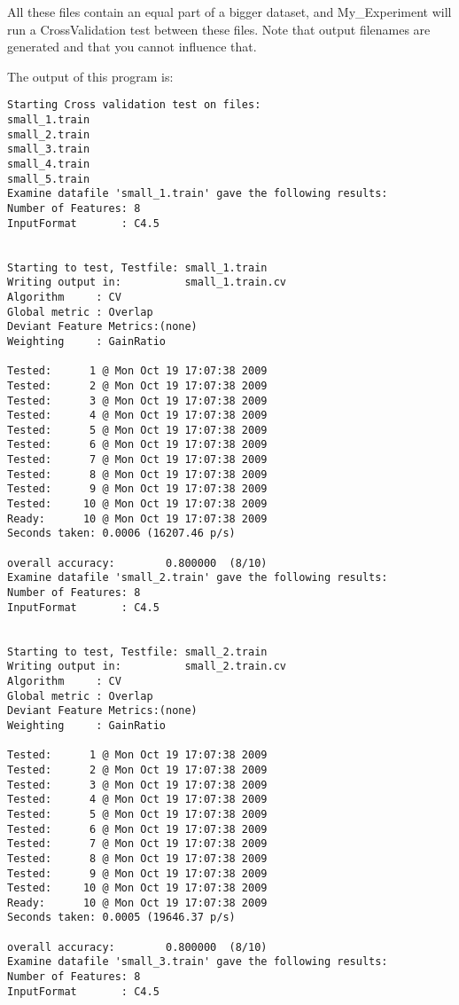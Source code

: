 \documentclass{report}
\begin{document}
All these files contain an equal part of a bigger dataset, and
My\_Experiment will run a CrossValidation test between these files.
Note that output filenames are generated and that you cannot influence
that.

The output of this program is:

\begin{footnotesize}
\begin{verbatim}
Starting Cross validation test on files:
small_1.train
small_2.train
small_3.train
small_4.train
small_5.train
Examine datafile 'small_1.train' gave the following results:
Number of Features: 8
InputFormat       : C4.5


Starting to test, Testfile: small_1.train
Writing output in:          small_1.train.cv
Algorithm     : CV
Global metric : Overlap
Deviant Feature Metrics:(none)
Weighting     : GainRatio

Tested:      1 @ Mon Oct 19 17:07:38 2009
Tested:      2 @ Mon Oct 19 17:07:38 2009
Tested:      3 @ Mon Oct 19 17:07:38 2009
Tested:      4 @ Mon Oct 19 17:07:38 2009
Tested:      5 @ Mon Oct 19 17:07:38 2009
Tested:      6 @ Mon Oct 19 17:07:38 2009
Tested:      7 @ Mon Oct 19 17:07:38 2009
Tested:      8 @ Mon Oct 19 17:07:38 2009
Tested:      9 @ Mon Oct 19 17:07:38 2009
Tested:     10 @ Mon Oct 19 17:07:38 2009
Ready:      10 @ Mon Oct 19 17:07:38 2009
Seconds taken: 0.0006 (16207.46 p/s)

overall accuracy:        0.800000  (8/10)
Examine datafile 'small_2.train' gave the following results:
Number of Features: 8
InputFormat       : C4.5


Starting to test, Testfile: small_2.train
Writing output in:          small_2.train.cv
Algorithm     : CV
Global metric : Overlap
Deviant Feature Metrics:(none)
Weighting     : GainRatio

Tested:      1 @ Mon Oct 19 17:07:38 2009
Tested:      2 @ Mon Oct 19 17:07:38 2009
Tested:      3 @ Mon Oct 19 17:07:38 2009
Tested:      4 @ Mon Oct 19 17:07:38 2009
Tested:      5 @ Mon Oct 19 17:07:38 2009
Tested:      6 @ Mon Oct 19 17:07:38 2009
Tested:      7 @ Mon Oct 19 17:07:38 2009
Tested:      8 @ Mon Oct 19 17:07:38 2009
Tested:      9 @ Mon Oct 19 17:07:38 2009
Tested:     10 @ Mon Oct 19 17:07:38 2009
Ready:      10 @ Mon Oct 19 17:07:38 2009
Seconds taken: 0.0005 (19646.37 p/s)

overall accuracy:        0.800000  (8/10)
Examine datafile 'small_3.train' gave the following results:
Number of Features: 8
InputFormat       : C4.5



\end{verbatim}
\end{footnotesize}
\end{document}
